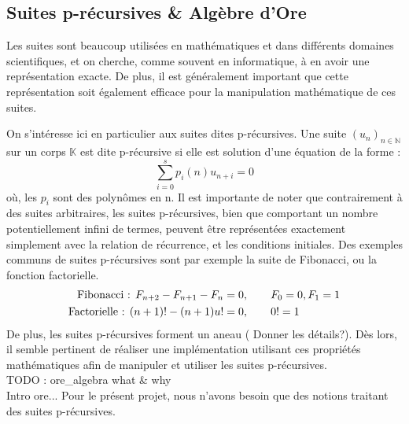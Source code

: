 \documentclass[final,12pt]{article}
\begin{document}
    \subsection{Suites p-récursives \& Algèbre d'Ore}
        \label{ssec:prec}
        \par Les suites sont beaucoup utilisées en mathématiques et dans différents domaines
        scientifiques, et on cherche, comme souvent en informatique, à en avoir une
        représentation exacte. De plus, il est généralement important que cette représentation
        soit également efficace pour la manipulation mathématique de ces suites.
        \par On s'intéresse ici en particulier aux suites dites p-récursives.
        Une suite $(u_n)_{n\in\mathbb N}$ sur un corps $\mathbb K$ est dite p-récursive
        si elle est solution d'une équation de la forme :
        \begin{equation}
            \sum_{i=0}^s p_i(n) u_{n+i} = 0
        \end{equation}
        où, les $p_i$ sont des polynômes en n. Il est importante de noter que contrairement
        à des suites arbitraires, les suites p-récursives, bien que comportant un nombre
        potentiellement infini de termes, peuvent être représentées exactement simplement
        avec la relation de récurrence, et les conditions initiales.
        Des exemples communs de suites p-récursives
        sont par exemple la suite de Fibonacci, ou la fonction factorielle.
        \begin{align*}
            \textnormal{Fibonacci : } F_{n+2} - F_{n+1} - F_n &= 0, \qquad F_0=0, F_1=1\\
            \textnormal{Factorielle : } (n+1)! - (n+1)u! &= 0, \qquad 0!=1
        \end{align*}
        De plus, les suites p-récursives forment un aneau ({\color{red} Donner les détails?}).
        Dès lors, il semble pertinent
        de réaliser une implémentation utilisant ces propriétés mathématiques afin de
        manipuler et utiliser les suites p-récursives.\\
        {\color{red} TODO : ore\_algebra what \& why\\ Intro ore...} Pour le présent projet,
        nous n'avons besoin que des notions traitant des suites p-récursives.
\end{document}
